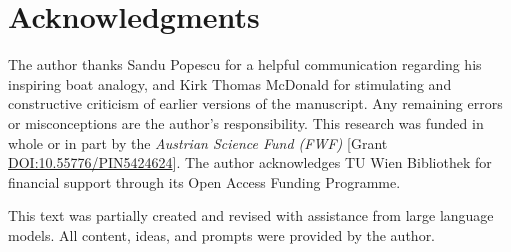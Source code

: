 \documentclass[a4paper]{article}
\begin{document}
\section*{Acknowledgments}
The author thanks Sandu Popescu for a helpful communication regarding his inspiring boat analogy, and Kirk Thomas McDonald for stimulating and constructive criticism of earlier versions of the manuscript. Any remaining errors or misconceptions are the author's responsibility.
This research was funded in whole or in part by the \textit{Austrian Science Fund (FWF)} [Grant \href{https://doi.org/10.55776/PIN5424624}{DOI:10.55776/PIN5424624}].
The author acknowledges TU Wien Bibliothek for financial support through its Open Access Funding Programme.

This text was partially created and revised with assistance from large language models. All content, ideas, and prompts were provided by the author.

%
%
\end{document}

